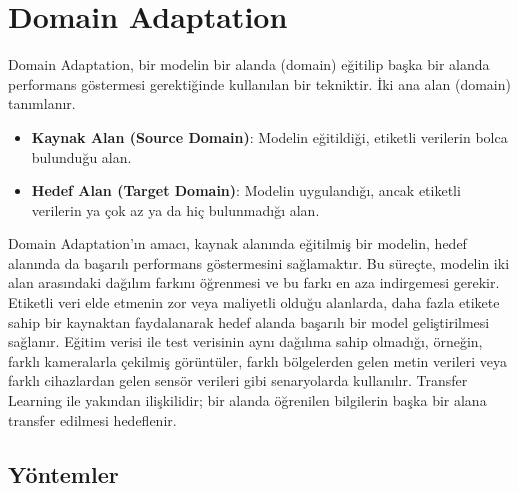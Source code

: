 \section{Domain Adaptation}

Domain Adaptation, bir modelin bir alanda (domain) eğitilip başka bir alanda performans göstermesi gerektiğinde kullanılan bir tekniktir. İki ana alan (domain) tanımlanır.

\begin{itemize}
    \item \textbf{Kaynak Alan (Source Domain)}: Modelin eğitildiği, etiketli verilerin bolca bulunduğu alan.
    \item \textbf{Hedef Alan (Target Domain)}: Modelin uygulandığı, ancak etiketli verilerin ya çok az ya da hiç bulunmadığı alan.
\end{itemize}

Domain Adaptation’ın amacı, kaynak alanında eğitilmiş bir modelin, hedef alanında da başarılı performans göstermesini sağlamaktır. Bu süreçte, modelin iki alan arasındaki dağılım farkını öğrenmesi ve bu farkı en aza indirgemesi gerekir. Etiketli veri elde etmenin zor veya maliyetli olduğu alanlarda, daha fazla etikete sahip bir kaynaktan faydalanarak hedef alanda başarılı bir model geliştirilmesi sağlanır. Eğitim verisi ile test verisinin aynı dağılıma sahip olmadığı, örneğin, farklı kameralarla çekilmiş görüntüler, farklı bölgelerden gelen metin verileri veya farklı cihazlardan gelen sensör verileri gibi senaryolarda kullanılır. Transfer Learning ile yakından ilişkilidir; bir alanda öğrenilen bilgilerin başka bir alana transfer edilmesi hedeflenir.

\subsection{Yöntemler}

